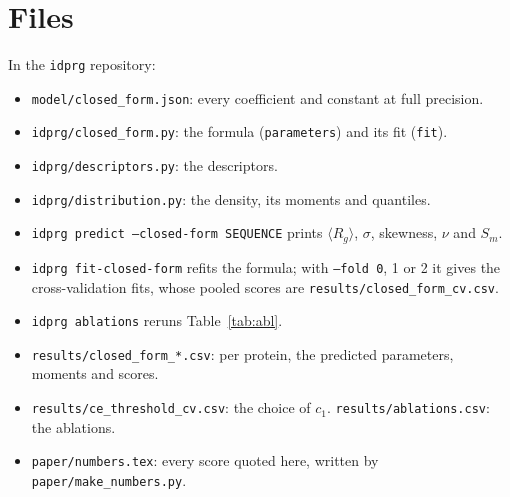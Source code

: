 \documentclass[11pt]{article}
\newcommand{\Rg}{R_g}
\begin{document}
\section{Files}
In the \texttt{idprg} repository:
\begin{itemize}
\item \texttt{model/closed\_form.json}: every coefficient and constant at full precision.
\item \texttt{idprg/closed\_form.py}: the formula (\texttt{parameters}) and its fit (\texttt{fit}).
\item \texttt{idprg/descriptors.py}: the descriptors.
\item \texttt{idprg/distribution.py}: the density, its moments and quantiles.
\item \texttt{idprg predict --closed-form SEQUENCE} prints $\langle\Rg\rangle$, $\sigma$, skewness, $\nu$ and $S_m$.
\item \texttt{idprg fit-closed-form} refits the formula; with \texttt{--fold 0}, 1 or 2 it gives the
  cross-validation fits, whose pooled scores are \texttt{results/closed\_form\_cv.csv}.
\item \texttt{idprg ablations} reruns Table~\ref{tab:abl}.
\item \texttt{results/closed\_form\_*.csv}: per protein, the predicted parameters, moments and scores.
\item \texttt{results/ce\_threshold\_cv.csv}: the choice of $c_1$. \texttt{results/ablations.csv}: the ablations.
\item \texttt{paper/numbers.tex}: every score quoted here, written by \texttt{paper/make\_numbers.py}.
\end{itemize}
\end{document}

